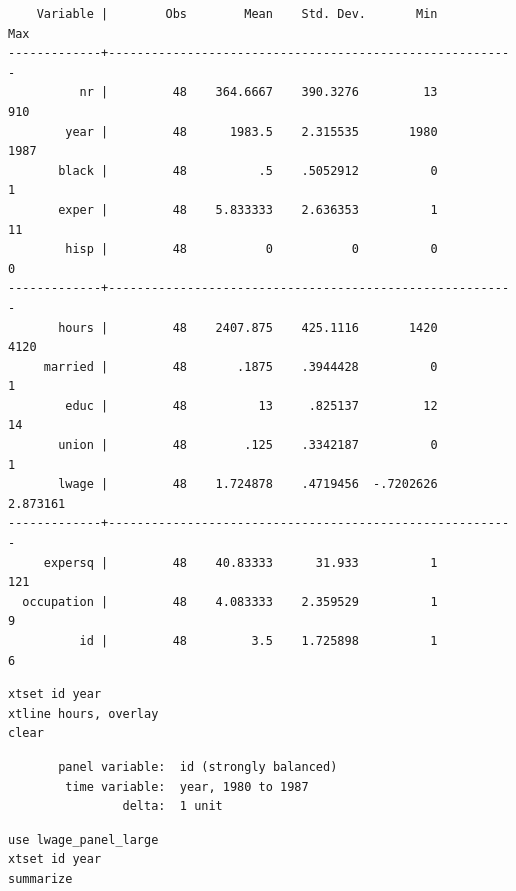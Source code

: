 \documentclass[]{book}
\begin{document}
\begin{verbatim}
    Variable |        Obs        Mean    Std. Dev.       Min        Max
-------------+---------------------------------------------------------
          nr |         48    364.6667    390.3276         13        910
        year |         48      1983.5    2.315535       1980       1987
       black |         48          .5    .5052912          0          1
       exper |         48    5.833333    2.636353          1         11
        hisp |         48           0           0          0          0
-------------+---------------------------------------------------------
       hours |         48    2407.875    425.1116       1420       4120
     married |         48       .1875    .3944428          0          1
        educ |         48          13     .825137         12         14
       union |         48        .125    .3342187          0          1
       lwage |         48    1.724878    .4719456  -.7202626   2.873161
-------------+---------------------------------------------------------
     expersq |         48    40.83333      31.933          1        121
  occupation |         48    4.083333    2.359529          1          9
          id |         48         3.5    1.725898          1          6
\end{verbatim}

\begin{verbatim}
xtset id year
xtline hours, overlay
clear
\end{verbatim}

\begin{verbatim}
       panel variable:  id (strongly balanced)
        time variable:  year, 1980 to 1987
                delta:  1 unit
\end{verbatim}

\begin{verbatim}
use lwage_panel_large
xtset id year
summarize
\end{verbatim}
\end{document}

